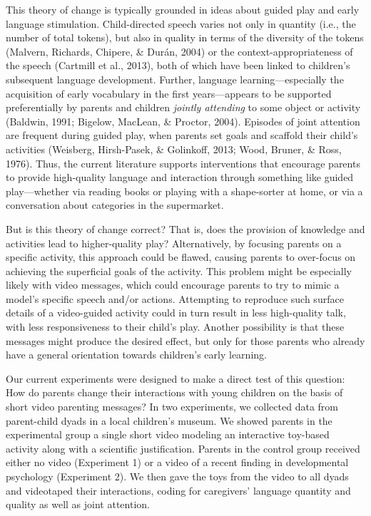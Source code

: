 \documentclass[man,floatsintext]{apa6}
\begin{document}
This theory of change is typically grounded in ideas about guided play and early language stimulation.
Child-directed speech varies not only in quantity (i.e., the number of total tokens), but also in quality in terms of the diversity of the tokens (Malvern, Richards, Chipere, \& Durán, 2004) or the context-appropriateness of the speech (Cartmill et al., 2013), both of which have been linked to children's subsequent language development.
Further, language learning---especially the acquisition of early vocabulary in the first years---appears to be supported preferentially by parents and children \emph{jointly attending} to some object or activity (Baldwin, 1991; Bigelow, MacLean, \& Proctor, 2004).
Episodes of joint attention are frequent during guided play, when parents set goals and scaffold their child's activities (Weisberg, Hirsh-Pasek, \& Golinkoff, 2013; Wood, Bruner, \& Ross, 1976).
Thus, the current literature supports interventions that encourage parents to provide high-quality language and interaction through something like guided play---whether via reading books or playing with a shape-sorter at home, or via a conversation about categories in the supermarket.

But is this theory of change correct? That is, does the provision of knowledge and activities lead to higher-quality play?
Alternatively, by focusing parents on a specific activity, this approach could be flawed, causing parents to over-focus on achieving the superficial goals of the activity.
This problem might be especially likely with video messages, which could encourage parents to try to mimic a model's specific speech and/or actions.
Attempting to reproduce such surface details of a video-guided activity could in turn result in less high-quality talk, with less responsiveness to their child's play.
Another possibility is that these messages might produce the desired effect, but only for those parents who already have a general orientation towards children's early learning.

Our current experiments were designed to make a direct test of this question: How do parents change their interactions with young children on the basis of short video parenting messages?
In two experiments, we collected data from parent-child dyads in a local children's museum.
We showed parents in the experimental group a single short video modeling an interactive toy-based activity along with a scientific justification.
Parents in the control group received either no video (Experiment 1) or a video of a recent finding in developmental psychology (Experiment 2).
We then gave the toys from the video to all dyads and videotaped their interactions, coding for caregivers' language quantity and quality as well as joint attention.
\end{document}
